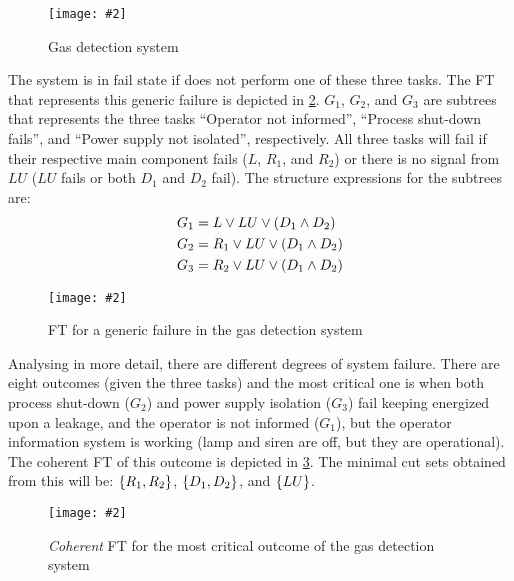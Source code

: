 \documentclass[en,twoside,onehalfspacing,phd]{risethesis}
\newcommand{\includegraphicsaspectratio}[2][1]{%
  \texttt{[image: \#2]}%
}
\newcommand{\setsin}[1]{\ensuremath\left\{ #1 \right\}}
\newcommand{\parsin}[1]{\ensuremath\left( #1 \right)}
\begin{document}
\begin{figure}[t]
  \centering
  \includegraphicsaspectratio[0.45]{gas-detection-system}
  \caption{Gas detection system}
  \label{fig:gas-detection-system}
\end{figure}

The system is in fail state if does not perform one of these three tasks.
The \acl{FT} that represents this generic failure is depicted in \cref{fig:ft-generic-failure-gas-detection-system}.
$G_1$, $G_2$, and $G_3$ are subtrees that represents the three tasks ``Operator not informed'', ``Process shut-down fails'', and ``Power supply not isolated'', respectively.
All three tasks will fail if their respective main component fails ($L$, $R_1$, and $R_2$) or there is no signal from $LU$ ($LU$ fails or both $D_1$ and $D_2$ fail).
The structure expressions for the subtrees are:
%
\begin{align*}
  G_1 & = L \lor LU \lor \parsin{D_1 \land D_2}\\
  G_2 & = R_1 \lor LU \lor \parsin{D_1 \land D_2}\\
  G_3 & = R_2 \lor LU \lor \parsin{D_1 \land D_2}
\end{align*}

\begin{figure}[t]
  \centering
  \includegraphicsaspectratio[1]{ft-generic-failure-gas-detection-system}
  \caption{\ac{FT} for a generic failure in the gas detection system}
  \label{fig:ft-generic-failure-gas-detection-system}
\end{figure}

Analysing in more detail, there are different degrees of system failure.
There are eight outcomes (given the three tasks) and the most critical one is when both process shut-down ($G_2$) and power supply isolation ($G_3$) fail keeping energized upon a leakage, and the operator is not informed ($G_1$), but the operator information system is working (lamp and siren are off, but they are operational).
The coherent \ac{FT} of this outcome is depicted in \cref{fig:outcome-4-coherent-ft}.
The minimal cut sets obtained from this will be: $\setsin{R_1, R_2}$, $\setsin{D_1, D_2}$, and $\setsin{LU}$.

\begin{figure}[t]
  \centering
  \includegraphicsaspectratio[0.5]{outcome-4-coherent-ft}
  \caption{\emph{Coherent} \ac{FT} for the most critical outcome of the gas detection system}
  \label{fig:outcome-4-coherent-ft}
\end{figure}
\end{document}
